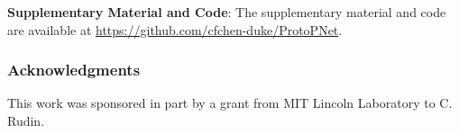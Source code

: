 \documentclass{article}
\theoremstyle{definition}
\theoremstyle{remark}
\begin{document}
\textbf{Supplementary Material and Code}: The supplementary material and code are available at \url{https://github.com/cfchen-duke/ProtoPNet}.


\subsubsection*{Acknowledgments}

This work was sponsored in part by a grant from MIT Lincoln Laboratory to C. Rudin.



\medskip
\end{document}
